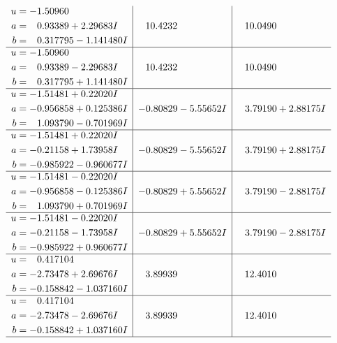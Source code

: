 \documentclass[1p]{elsarticle_modified}
\theoremstyle{definition}
\begin{document}
$$\begin{array}{c|c|c}
\begin{aligned}
u &= -1.50960\phantom{ +0.000000I} \\
a &= \phantom{-}0.93389 + 2.29683 I \\
b &= \phantom{-}0.317795 - 1.141480 I\end{aligned}
 & \phantom{-}10.4232\phantom{ +0.000000I} & \phantom{-}10.0490\phantom{ +0.000000I} \\ \hline\begin{aligned}
u &= -1.50960\phantom{ +0.000000I} \\
a &= \phantom{-}0.93389 - 2.29683 I \\
b &= \phantom{-}0.317795 + 1.141480 I\end{aligned}
 & \phantom{-}10.4232\phantom{ +0.000000I} & \phantom{-}10.0490\phantom{ +0.000000I} \\ \hline\begin{aligned}
u &= -1.51481 + 0.22020 I \\
a &= -0.956858 + 0.125386 I \\
b &= \phantom{-}1.093790 - 0.701969 I\end{aligned}
 & -0.80829 - 5.55652 I & \phantom{-}3.79190 + 2.88175 I \\ \hline\begin{aligned}
u &= -1.51481 + 0.22020 I \\
a &= -0.21158 + 1.73958 I \\
b &= -0.985922 - 0.960677 I\end{aligned}
 & -0.80829 - 5.55652 I & \phantom{-}3.79190 + 2.88175 I \\ \hline\begin{aligned}
u &= -1.51481 - 0.22020 I \\
a &= -0.956858 - 0.125386 I \\
b &= \phantom{-}1.093790 + 0.701969 I\end{aligned}
 & -0.80829 + 5.55652 I & \phantom{-}3.79190 - 2.88175 I \\ \hline\begin{aligned}
u &= -1.51481 - 0.22020 I \\
a &= -0.21158 - 1.73958 I \\
b &= -0.985922 + 0.960677 I\end{aligned}
 & -0.80829 + 5.55652 I & \phantom{-}3.79190 - 2.88175 I \\ \hline\begin{aligned}
u &= \phantom{-}0.417104\phantom{ +0.000000I} \\
a &= -2.73478 + 2.69676 I \\
b &= -0.158842 - 1.037160 I\end{aligned}
 & \phantom{-}3.89939\phantom{ +0.000000I} & \phantom{-}12.4010\phantom{ +0.000000I} \\ \hline\begin{aligned}
u &= \phantom{-}0.417104\phantom{ +0.000000I} \\
a &= -2.73478 - 2.69676 I \\
b &= -0.158842 + 1.037160 I\end{aligned}
 & \phantom{-}3.89939\phantom{ +0.000000I} & \phantom{-}12.4010\phantom{ +0.000000I}\\
 \hline 
 \end{array}$$\newpage\newpage\renewcommand{\arraystretch}{1}
\end{document}
